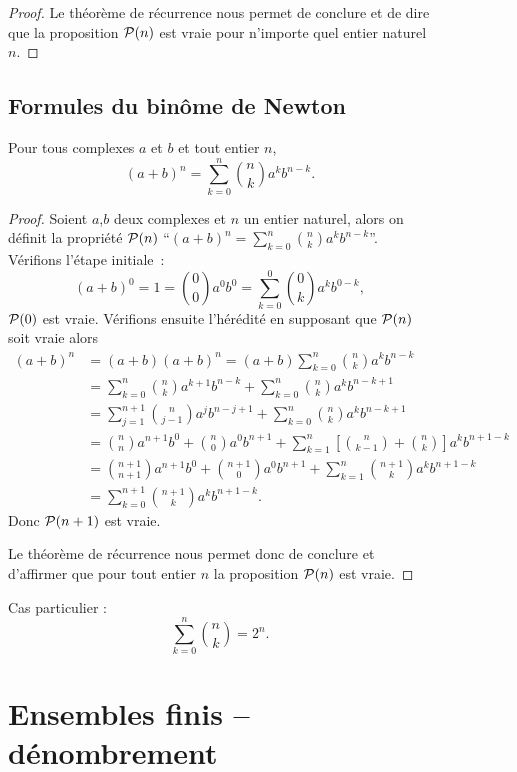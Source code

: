 \begin{figure}
\begin{proof}
Le théorème de récurrence nous permet de conclure et de dire que la proposition \(\P(n)\) est vraie pour n'importe quel entier naturel \(n\).
\end{proof}

\subsection{Formules du binôme de Newton}

\begin{prop}
  Pour tous complexes \(a\) et \(b\) et tout entier \(n\),
  \begin{equation}
    (a+b)^n=\sum_{k=0}^n \binom{n}{k}a^kb^{n-k}.
  \end{equation}
\end{prop}
\begin{proof}
  Soient \(a\),\(b\) deux complexes et \(n\) un entier naturel, alors on définit la propriété \(\P(n)\) ``\((a+b)^n=\sum_{k=0}^n \binom{n}{k}a^kb^{n-k}\)''. Vérifions l'étape initiale~:
\begin{equation}
  (a+b)^0=1=\binom{0}{0}a^0b^0=\sum_{k=0}^0 \binom{0}{k}a^kb^{0-k},
\end{equation}
\(\P(0)\) est vraie. Vérifions ensuite l'hérédité en supposant que \(\P(n)\) soit vraie alors
\begin{align}
  (a+b)^n&=(a+b)(a+b)^n=(a+b)\sum_{k=0}^n \binom{n}{k}a^kb^{n-k}\\
  &=\sum_{k=0}^n \binom{n}{k}a^{k+1}b^{n-k}+\sum_{k=0}^n \binom{n}{k}a^kb^{n-k+1}\\
  &=\sum_{j=1}^{n+1} \binom{n}{j-1}a^{j}b^{n-j+1}+\sum_{k=0}^n \binom{n}{k}a^kb^{n-k+1}\\
  &=\binom{n}{n}a^{n+1}b^0 +\binom{n}{0}a^0b^{n+1} + \sum_{k=1}^{n}\left[\binom{n}{k-1}+\binom{n}{k}\right]a^kb^{n+1-k}\\
  &=\binom{n+1}{n+1}a^{n+1}b^0+\binom{n+1}{0}a^0b^{n+1}+ \sum_{k=1}^{n}\binom{n+1}{k}a^kb^{n+1-k}\\
  &=\sum_{k=0}^{n+1}\binom{n+1}{k}a^kb^{n+1-k}.
\end{align}
Donc \(\P(n+1)\) est vraie.

Le théorème de récurrence nous permet donc de conclure et d'affirmer que pour tout entier \(n\) la proposition \(\P(n)\) est vraie.
\end{proof}
Cas particulier :
\begin{equation}
  \sum_{k=0}^n \binom{n}{k}=2^n.
\end{equation}

\section{Ensembles finis -- dénombrement}


\end{figure}

